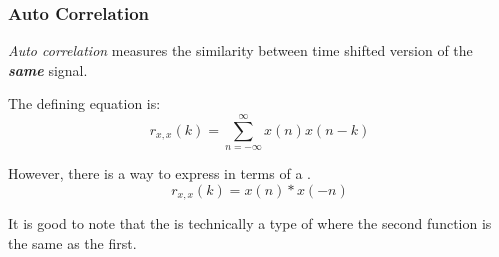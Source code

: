 \subsubsection{Auto Correlation}\label{subsubsec:Auto_Correlation}
\begin{definition}\label{def:Auto_Correlation}
  \emph{Auto correlation} measures the similarity between time shifted version of the \textbf{\emph{same}} signal.

  The defining equation is:
  \begin{equation}\label{eq:Auto_Correlation}
    r_{x,x}(k) = \sum\limits_{n=-\infty}^{\infty} x(n) x(n-k)
  \end{equation}

  However, there is a way to express  in terms of a .
  \begin{equation}\label{eq:Auto_Correlation-Convolution}
    r_{x,x}(k) = x(n) * x(-n)
  \end{equation}

  \begin{remark}\label{rmk:Cross-Auto_Correlation_Relation}
    It is good to note that the  is technically a type of  where the second function is the same as the first.
  \end{remark}
\end{definition}

